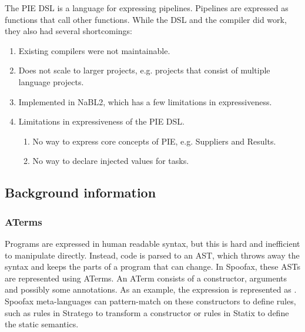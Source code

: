 The PIE DSL is a language for expressing pipelines.
Pipelines are expressed as functions that call other functions.
While the DSL and the compiler did work, they also had several shortcomings:
\begin{enumerate}
  \item Existing compilers were not maintainable.
  \item Does not scale to larger projects, e.g. projects that consist of multiple language projects.
  \item Implemented in NaBL2, which has a few limitations in expressiveness.
  \item Limitations in expressiveness of the PIE DSL.
  \begin{enumerate}
    \item No way to express core concepts of PIE, e.g. Suppliers and Results.
    \item No way to declare injected values for tasks.
  \end{enumerate}
\end{enumerate}



\subsection{Background information}
\label{subsec:problem_analysis__background}


\subsubsection{ATerms}
\label{subsubsec:problem_analysis__background__aterms}

Programs are expressed in human readable syntax, but this is hard and inefficient to manipulate directly.
Instead, code is parsed to an AST, which throws away the syntax and keeps the parts of a program that can change.
In Spoofax, these ASTs are represented using ATerms.
An ATerm consists of a constructor, arguments and possibly some annotations.
As an example, the expression  is represented as .
Spoofax meta-languages can pattern-match on these constructors to define rules, such as rules in Stratego to transform a constructor or rules in Statix to define the static semantics.

